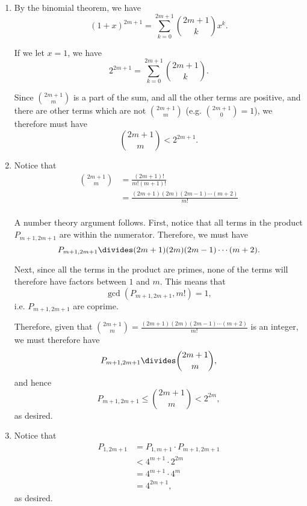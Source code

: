 \Question{\currfilebase}

\begin{enumerate}
    \item By the binomial theorem, we have
          \[
              (1 + x)^{2m + 1} = \sum_{k = 0}^{2m + 1} \binom{2m + 1}{k} x^k.
          \]

          If we let \(x = 1\), we have
          \[
              2^{2m + 1} = \sum_{k = 0}^{2m + 1} \binom{2m + 1}{k}.
          \]

          Since \(\binom{2m + 1}{m}\) is a part of the sum, and all the other terms are positive, and there are other terms which are not \(\binom{2m + 1}{m}\) (e.g. \(\binom{2m + 1}{0} = 1\)), we therefore must have
          \[
              \binom{2m + 1}{m} < 2^{2m + 1}.
          \]

    \item Notice that
          \begin{align*}
              \binom{2m + 1}{m} & = \frac{(2m + 1)!}{m! (m + 1)!}                  \\
                                & = \frac{(2m + 1)(2m)(2m - 1) \cdots (m + 2)}{m!} \\
          \end{align*}

          A number theory argument follows. First, notice that all terms in the product \(P_{m + 1, 2m + 1}\) are within the numerator. Therefore, we must have
          \[
              P_{m + 1, 2m + 1} \divides (2m + 1)(2m)(2m - 1) \cdots (m + 2).
          \]

          Next, since all the terms in the product are primes, none of the terms will therefore have factors between \(1\) and \(m\). This means that
          \[
              \gcd\left(P_{m + 1, 2m + 1}, m!\right) = 1,
          \]
          i.e. \(P_{m + 1, 2m + 1}\) are coprime.

          Therefore, given that \(\binom{2m + 1}{m} = \frac{(2m + 1)(2m)(2m - 1) \cdots (m + 2)}{m!}\) is an integer, we must therefore have
          \[
              P_{m + 1, 2m + 1} \divides \binom{2m + 1}{m},
          \]
          and hence
          \[
              P_{m + 1, 2m + 1} \leq \binom{2m + 1}{m} < 2^{2m},
          \]
          as desired.

    \item Notice that
          \begin{align*}
              P_{1, 2m + 1} & = P_{1, m + 1} \cdot P_{m + 1, 2m + 1} \\
                            & < 4^{m + 1} \cdot 2^{2m}               \\
                            & = 4^{m + 1} \cdot 4^m                  \\
                            & = 4^{2m + 1},
          \end{align*}
          as desired.


\end{enumerate}
